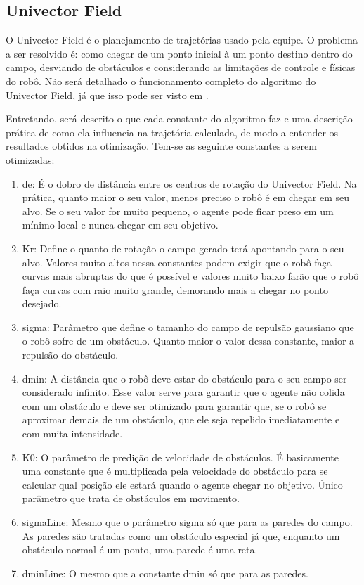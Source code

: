 \documentclass[10pt,fleqn,a4paper]{article}
\begin{document}
\subsection{Univector Field}

O Univector Field é o planejamento de trajetórias usado pela equipe. O problema a ser resolvido é: como chegar de um ponto inicial à um ponto destino dentro do campo, desviando de obstáculos e considerando as limitações de controle e físicas do robô. Não será detalhado o funcionamento completo do algoritmo do Univector Field, já que isso pode ser visto em \cite{univector}.

Entretando, será descrito o que cada constante do algoritmo faz e uma descrição prática de como ela influencia na trajetória calculada, de modo a entender os resultados obtidos na otimização. Tem-se as seguinte constantes a serem otimizadas:
\begin{enumerate}
\item de: É o dobro de distância entre os centros de rotação do Univector Field. Na prática, quanto maior o seu valor, menos preciso o robô é em chegar em seu alvo. Se o seu valor for muito pequeno, o agente pode ficar preso em um mínimo local e nunca chegar em seu objetivo.
\item Kr: Define o quanto de rotação o campo gerado terá apontando para o seu alvo. Valores muito altos nessa constantes podem exigir que o robô faça curvas mais abruptas do que é possível e valores muito baixo farão que o robô faça curvas com raio muito grande, demorando mais a chegar no ponto desejado.
\item sigma: Parâmetro que define o tamanho do campo de repulsão gaussiano que o robô sofre de um obstáculo. Quanto maior o valor dessa constante, maior a repulsão do obstáculo.
\item dmin: A distância que o robô deve estar do obstáculo para o seu campo ser considerado infinito. Esse valor serve para garantir que o agente não colida com um obstáculo e deve ser otimizado para garantir que, se o robô se aproximar demais de um obstáculo, que ele seja repelido imediatamente e com muita intensidade.
\item K0: O parâmetro de predição de velocidade de obstáculos. É basicamente uma constante que é multiplicada pela velocidade do obstáculo para se calcular qual posição ele estará quando o agente chegar no objetivo. Único parâmetro que trata de obstáculos em movimento.
\item sigmaLine: Mesmo que o parâmetro sigma só que para as paredes do campo. As paredes são tratadas como um obstáculo especial já que, enquanto um obstáculo normal é um ponto, uma parede é uma reta.
\item dminLine:  O mesmo que a constante dmin só que para as paredes.
\end{enumerate}
\end{document}
